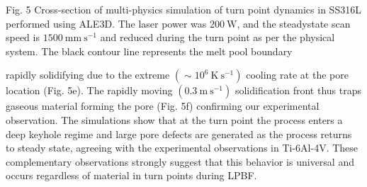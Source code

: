 \documentclass[10pt]{article}
\begin{document}
Fig. 5 Cross-section of multi-physics simulation of turn point dynamics in SS316L performed using ALE3D. The laser power was $200 \mathrm{~W}$, and the steadystate scan speed is $1500 \mathrm{~mm} \mathrm{~s}^{-1}$ and reduced during the turn point as per the physical system. The black contour line represents the melt pool boundary

rapidly solidifying due to the extreme $\left(\sim 10^{6} \mathrm{~K} \mathrm{~s}^{-1}\right)$ cooling rate at the pore location (Fig. 5e). The rapidly moving $\left(0.3 \mathrm{~m} \mathrm{~s}^{-1}\right)$ solidification front thus traps gaseous material forming the pore (Fig. 5f) confirming our experimental observation. The simulations show that at the turn point the process enters a deep keyhole regime and large pore defects are generated as the process returns to steady state, agreeing with the experimental observations in Ti-6Al-4V. These complementary observations strongly suggest that this behavior is universal and occurs regardless of material in turn points during LPBF.
\end{document}
